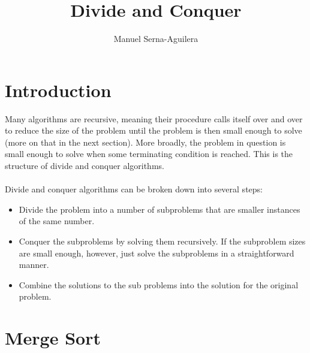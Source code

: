 \documentclass{article}
\title{Divide and Conquer}
\author{Manuel Serna-Aguilera}
\date{}
\begin{document}
\maketitle
\section*{Introduction}
Many algorithms are recursive, meaning their procedure calls itself over and over to reduce the size of the problem until the problem is then small enough to solve (more on that in the next section). More broadly, the problem in question is small enough to solve when some terminating condition is reached. This is the structure of divide and conquer algorithms.
\\
\\
Divide and conquer algorithms can be broken down into several steps:
\begin{itemize}
  \item Divide the problem into a number of subproblems that are smaller instances of the same number.
  \item Conquer the subproblems by solving them recursively. If the subproblem sizes are small enough, however, just solve the subproblems in a straightforward manner.
  \item Combine the solutions to the sub problems into the solution for the original problem.
\end{itemize}

\section*{Merge Sort}
\end{document}
